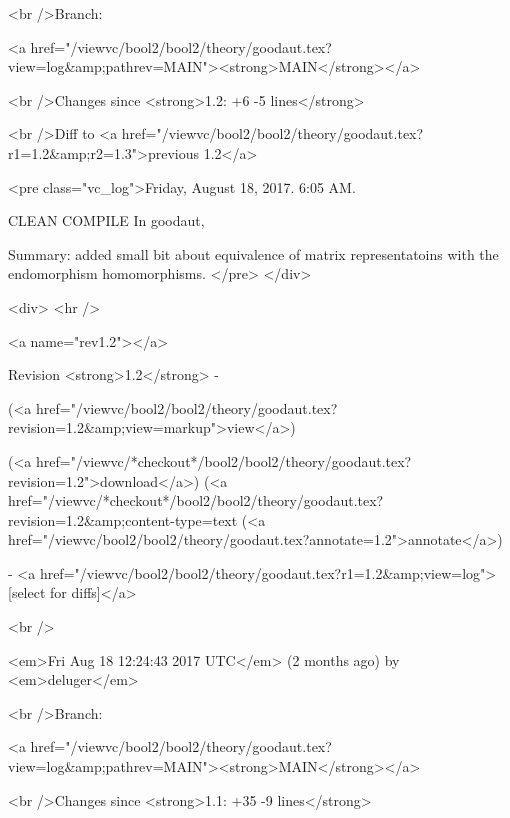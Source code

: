 <br />Branch:

<a href="/viewvc/bool2/bool2/theory/goodaut.tex?view=log&amp;pathrev=MAIN"><strong>MAIN</strong></a>







<br />Changes since <strong>1.2: +6 -5 lines</strong>








<br />Diff to <a href="/viewvc/bool2/bool2/theory/goodaut.tex?r1=1.2&amp;r2=1.3">previous 1.2</a>










<pre class="vc_log">Friday, August 18, 2017. 6:05 AM.

CLEAN COMPILE
In goodaut,

Summary: added small bit about equivalence of matrix representatoins
with the endomorphism homomorphisms.
</pre>
</div>



<div>
<hr />

<a name="rev1.2"></a>


Revision <strong>1.2</strong> -


(<a href="/viewvc/bool2/bool2/theory/goodaut.tex?revision=1.2&amp;view=markup">view</a>)


(<a href="/viewvc/*checkout*/bool2/bool2/theory/goodaut.tex?revision=1.2">download</a>)
(<a href="/viewvc/*checkout*/bool2/bool2/theory/goodaut.tex?revision=1.2&amp;content-type=text%
(<a href="/viewvc/bool2/bool2/theory/goodaut.tex?annotate=1.2">annotate</a>)



- <a href="/viewvc/bool2/bool2/theory/goodaut.tex?r1=1.2&amp;view=log">[select for diffs]</a>




<br />

<em>Fri Aug 18 12:24:43 2017 UTC</em>
(2 months ago)
by <em>deluger</em>


<br />Branch:

<a href="/viewvc/bool2/bool2/theory/goodaut.tex?view=log&amp;pathrev=MAIN"><strong>MAIN</strong></a>







<br />Changes since <strong>1.1: +35 -9 lines</strong>








